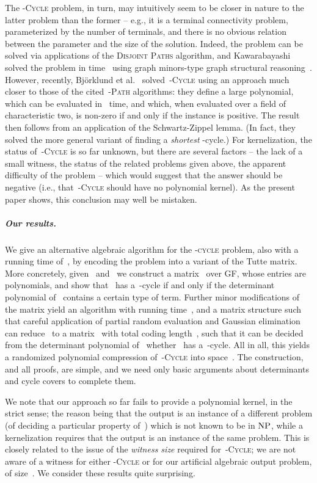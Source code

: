 \documentclass[a4paper,11pt]{article}
\newcommand{\cclass}[1]{\ensuremath{\mbox{\textup{#1}}}\xspace}
\newcommand{\NP}{\cclass{NP}}
\begin{document}
The \textsc{-Cycle} problem, in turn, may intuitively seem to be closer in nature to
the latter problem than the former -- e.g., it is a terminal connectivity problem,
parameterized by the number of terminals, and there is no obvious relation between the
parameter and the size of the solution. Indeed, the problem can be solved via applications
of the \textsc{Disjoint Paths} algorithm, and Kawarabayashi  
solved the problem in time~ using graph minors-type graph structural
reasoning~\cite{Kawarabayashi08}. However, recently, Bj\"orklund et
al.~\cite{BjorklundHT12} solved~\textsc{-Cycle} using 
an approach much closer to those of the cited~\textsc{-Path} algorithms: they define a
large polynomial, which can be evaluated in~ time, and which, when evaluated
over a field of characteristic two, is non-zero if and only if the instance is positive.
The result then follows from an application of the Schwartz-Zippel lemma. (In fact, they
solved the more general variant of finding a \emph{shortest} -cycle.)
For kernelization, the status of~\textsc{-Cycle} is so far unknown, but there are
several factors -- the lack of a small witness, the status of the related problems given
above, the apparent difficulty of the problem -- which would suggest that the answer
should be negative (i.e., that~\textsc{-Cycle} should have no polynomial kernel).
As the present paper shows, this conclusion may well be mistaken. 


\subparagraph*{Our results.}
We give an alternative algebraic algorithm for the \textsc{-cycle} problem,
also with a running time of~, by encoding the problem into a variant of the
Tutte matrix. More concretely, given~ and~ we construct a matrix~ over 
GF, whose entries are polynomials, and show that~ has a~-cycle if
and only if the determinant polynomial of~ contains a certain type of
term. Further minor modifications of the matrix yield an algorithm with running
time~, and a matrix structure such that careful application of partial random
evaluation and Gaussian elimination can reduce~ to a matrix~ with total coding
length~, such that it can be decided from the determinant polynomial of~ 
whether~ has a~-cycle. All in all, this yields a randomized polynomial compression
of~\textsc{-Cycle} into space~. The construction, and all proofs, are simple,
and we need only basic arguments about determinants and cycle covers to complete them. 

We note that our approach so far fails to provide a polynomial kernel, in the strict
sense; the reason being that the output is an instance of a different problem 
(of deciding a particular property of~) which is not known to be in \NP,
while a kernelization requires that the output is an instance of the same problem.
This is closely related to the issue of the \emph{witness size} required
for~\textsc{-Cycle}; we are not aware of a witness for either \textsc{-Cycle} or
for our artificial algebraic output problem, of size~. 
We consider these results quite surprising. 
\end{document}
